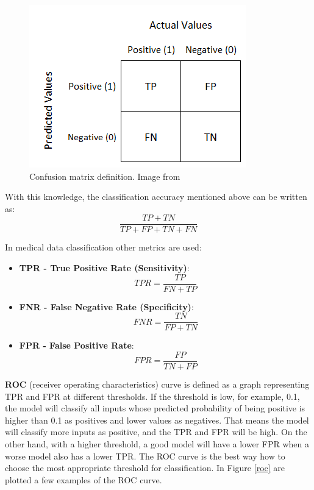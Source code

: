 \documentclass[thesis=B,english]{FITthesis}[2019/12/23]
\begin{document}
\begin{figure}[ht]
		\includegraphics[scale=0.6]{images/confusion_matrix.png}
		\centering
		\caption{Confusion matrix definition. Image from \cite{confusion_matrix}}
		\label{conf_matrix}
\end{figure}

With this knowledge, the classification accuracy mentioned above can be written as:
\begin{equation}
    \dfrac{TP+TN}{TP+FP+TN+FN}
\end{equation}

In medical data classification other metrics are used:
\begin{itemize}
	\item \textbf{TPR - True Positive Rate (Sensitivity)}: 
	$$TPR = \dfrac{TP}{FN + TP}$$
	\item \textbf{FNR - False Negative Rate (Specificity)}:
	$$FNR = \dfrac{TN}{FP + TN}$$
	\item \textbf{FPR - False Positive Rate}:
	$$FPR = \dfrac{FP}{TN + FP}$$
\end{itemize}

\textbf{ROC} (receiver operating characteristics) curve is defined as a graph representing TPR and FPR at different thresholds. If the threshold is low, for example, 0.1, the model will classify all inputs whose predicted probability of being positive is higher than 0.1 as positives and lower values as negatives. That means the model will classify more inputs as positive, and the TPR and FPR will be high. On the other hand, with a higher threshold, a good model will have a lower FPR when a worse model also has a lower TPR. The ROC curve is the best way how to choose the most appropriate threshold for classification.\cite{roc_auc_google} In Figure \ref{roc} are plotted a few examples of the ROC curve.  
\end{document}
